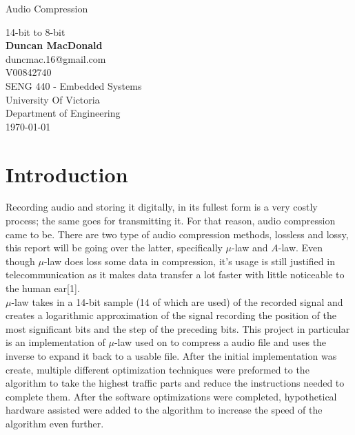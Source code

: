 \documentclass[12pt]{article}
\begin{document}
\begin{titlepage}

\begin{center}
\begin{huge}
Audio Compression\\
\end{huge}
14-bit to 8-bit\\
\vspace{1.5cm}
\textbf{Duncan MacDonald}\\
duncmac.16@gmail.com\\
V00842740\\
\vfill
SENG 440 - Embedded Systems\\
University Of Victoria\\
Department of Engineering\\
\vspace{1.5cm}
\today
\end{center}
\end{titlepage}
\newpage
\tableofcontents
\listoffigures
\newpage
\section{Introduction}
\indent 
Recording audio and storing it digitally, in its fullest form is a very costly process; the same goes for transmitting it. For that reason, audio compression came to be. There are two type of audio compression methods, lossless and lossy, this report will be going over the latter, specifically $\mu$-law and $A$-law. Even though $\mu$-law does loss some data in compression, it's usage is still justified in telecommunication as it makes data transfer a lot faster with little noticeable to the human ear[1].\\

$\mu$-law takes in a 14-bit sample (14 of which are used) of the recorded signal and creates a logarithmic approximation of the signal recording the position of the most significant bits and the step of the preceding bits. This project in particular is an implementation of $\mu$-law used on to compress a audio file and uses the inverse to expand it back to a usable file. After the initial implementation was create, multiple different optimization techniques were preformed to the algorithm to take the highest traffic parts and reduce the instructions needed to complete them. After the software optimizations were completed, hypothetical hardware assisted were added to the algorithm to increase the speed of the algorithm even further.\\
\end{document}

